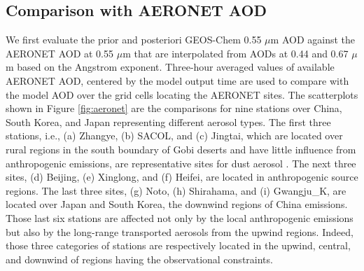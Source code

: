  \subsection{Comparison with AERONET AOD}

 We first evaluate the prior and posteriori GEOS-Chem 0.55 $\mu$m AOD against
 the AERONET AOD at 0.55 $\mu$m that are interpolated from AODs at 0.44 and 0.67 $\mu$m
 based on the Angstrom exponent.
 Three-hour averaged values of available AERONET AOD,
 centered by the model output time are used to compare with
 the model AOD over the grid cells locating the AERONET sites.
 The scatterplots shown in Figure \ref{fig:aeronet} are the comparisons
 for nine stations over China, South Korea, and Japan representing different aerosol types.
 The first three stations, i.e., (a) Zhangye, (b) SACOL, and (c) Jingtai,
 which are located over rural regions in the south boundary of Gobi deserts
 and have little influence from anthropogenic emissions,
 are representative sites for dust aerosol \citep{Ge10}.
 The next three sites, (d) Beijing, (e) Xinglong, and (f) Heifei,
 are located in anthropogenic source regions.
 The last three sites, (g) Noto, (h) Shirahama, and (i) Gwangju\_K,
 are located over Japan and South Korea, the downwind regions of China emissions.
 Those last six stations are affected not only by the local anthropogenic emissions
 but also by the long-range transported aerosols from the upwind regions.
 Indeed, those three categories of stations are respectively located
 in the upwind, central, and downwind of regions having the observational constraints.

